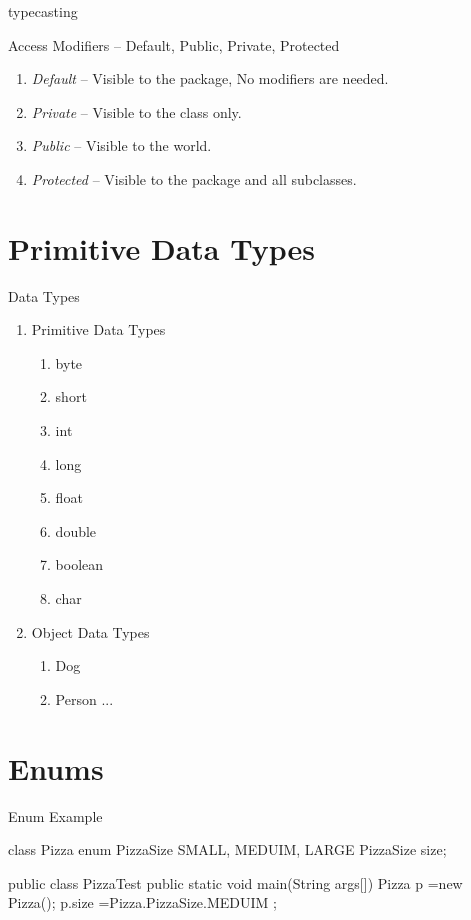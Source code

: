 \documentclass[11pt]{beamer}
\begin{document}
\begin{frame}{typecasting}

\end{frame}



\begin{frame}{Access Modifiers -- Default, Public, Private, Protected}

\begin{enumerate}
\item \emph{Default} -- Visible to the package,  No modifiers are needed.
\item \emph{Private} -- Visible to the class only.
\item \emph{Public} -- Visible to the world.
\item \emph{Protected} -- Visible to the package and all subclasses.    
\end{enumerate}
\end{frame}


\section{Primitive Data Types}
\begin{frame}{Data Types}
\begin{enumerate}
\item Primitive Data Types
\begin{enumerate}
\item byte
\item short
\item int
\item long
\item float
\item double
\item boolean
\item char
\end{enumerate}
\item Object Data Types
\begin{enumerate}
\item Dog
\item Person ...
\end{enumerate}
\end{enumerate}
\end{frame}

\section{Enums}
\begin{frame}[containsverbatim]{Enum Example}
\begin{java}
class Pizza{
	enum PizzaSize{ SMALL, MEDUIM, LARGE }
	PizzaSize size;
}

public class PizzaTest{
	public static void main(String args[]){
		Pizza p =new Pizza();
		p.size =Pizza.PizzaSize.MEDUIM ;
	}
}
\end{java}
\end{frame}
\end{document}
